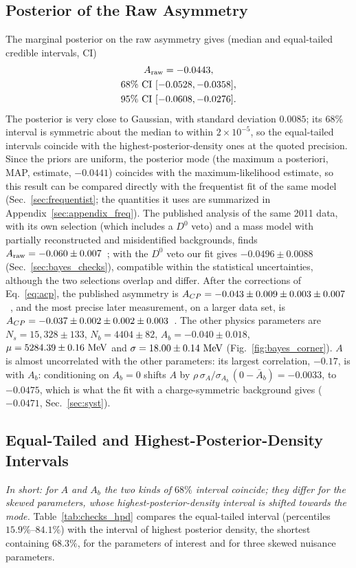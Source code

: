 \subsection{Posterior of the Raw Asymmetry}
The marginal posterior on the raw asymmetry gives (median and equal-tailed credible intervals, CI)
\begin{gather*}
A_{\mathrm{raw}} = -0.0443, \\
68\%~\text{CI}~[-0.0528,-0.0358], \\ 95\%~\text{CI}~[-0.0608,-0.0276].
\end{gather*}
The posterior is very close to Gaussian, with standard deviation $0.0085$; its 68\% interval is symmetric about the median to within $2\times10^{-5}$, so the equal-tailed intervals coincide with the highest-posterior-density ones at the quoted precision. Since the priors are uniform, the posterior mode (the maximum a posteriori, MAP, estimate, $-0.0441$) coincides with the maximum-likelihood estimate, so this result can be compared directly with the frequentist fit of the same model (Sec.~\ref{sec:frequentist}; the quantities it uses are summarized in Appendix~\ref{sec:appendix_freq}). The published analysis of the same 2011 data, with its own selection (which includes a $D^0$ veto) and a mass model with partially reconstructed and misidentified backgrounds, finds $A_{\mathrm{raw}}=-0.060\pm0.007$~\cite{lhcb_cpv_2013}; with the $D^0$ veto our fit gives $-0.0496\pm0.0088$ (Sec.~\ref{sec:bayes_checks}), compatible within the statistical uncertainties, although the two selections overlap and differ. After the corrections of Eq.~\eqref{eq:acp}, the published asymmetry is $A_{CP}=-0.043\pm0.009\pm0.003\pm0.007$~\cite{lhcb_cpv_2013}, and the most precise later measurement, on a larger data set, is $A_{CP}=-0.037\pm0.002\pm0.002\pm0.003$~\cite{lhcb_cpv_prd2023,lhcb_cpv_paper}. The other physics parameters are $N_s=15{,}328\pm133$, $N_b=4404\pm82$, $A_b=-0.040\pm0.018$, $\mu=5284.39\pm0.16\,\,\text{Me\hspace{-.08em}V}$ and $\sigma=18.00\pm0.14\,\,\text{Me\hspace{-.08em}V}$ (Fig.~\ref{fig:bayes_corner}). $A$ is almost uncorrelated with the other parameters: its largest correlation, $-0.17$, is with $A_b$: conditioning on $A_b=0$ shifts $A$ by $\rho\,\sigma_A/\sigma_{A_b}\,(0-\bar A_b)=-0.0033$, to $-0.0475$, which is what the fit with a charge-symmetric background gives ($-0.0471$, Sec.~\ref{sec:syst}).

\subsection{Equal-Tailed and Highest-Posterior-Density Intervals}
\label{sec:checks_hpd}
\emph{In short: for $A$ and $A_b$ the two kinds of $68\%$ interval coincide; they differ for the skewed parameters, whose highest-posterior-density interval is shifted towards the mode.}
Table~\ref{tab:checks_hpd} compares the equal-tailed interval (percentiles $15.9\%$--$84.1\%$) with the interval of highest posterior density, the shortest containing $68.3\%$, for the parameters of interest and for three skewed nuisance parameters.

